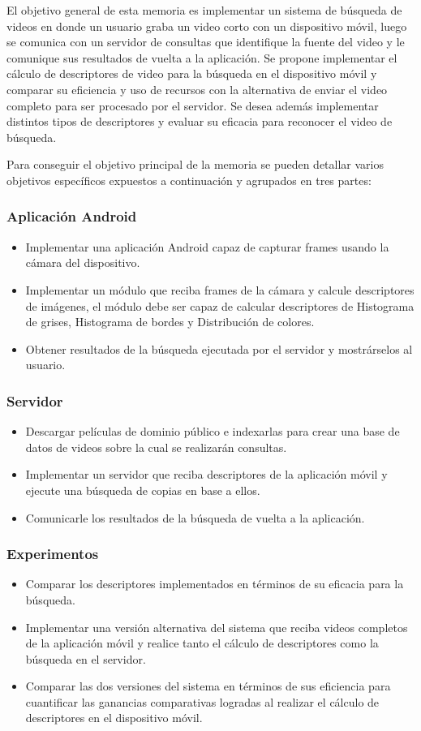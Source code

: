 El objetivo general de esta memoria es implementar un sistema de búsqueda de videos en donde un usuario graba un video corto con un dispositivo móvil, luego se comunica con un servidor de consultas que identifique la fuente del video y le comunique sus resultados de vuelta a la aplicación. Se propone implementar el cálculo de descriptores de video para la búsqueda en el dispositivo móvil y comparar su eficiencia y uso de recursos con la alternativa de enviar el video completo para ser procesado por el servidor. Se desea además implementar distintos tipos de descriptores y evaluar su eficacia para reconocer el video de búsqueda.

Para conseguir el objetivo principal de la memoria se pueden detallar varios objetivos específicos expuestos a continuación y agrupados en tres partes: 
\subsubsection*{Aplicación Android}
\begin{itemize}
\item Implementar una aplicación Android capaz de capturar frames usando la cámara del dispositivo.
\item Implementar un módulo que reciba frames de la cámara y calcule descriptores de imágenes, el módulo debe ser capaz de calcular descriptores de Histograma de grises, Histograma de bordes y Distribución de colores.
\item Obtener resultados de la búsqueda ejecutada por el servidor y mostrárselos al usuario.
\end{itemize}
\subsubsection*{Servidor}
\begin{itemize}
\item Descargar películas de dominio público e indexarlas para crear una base de datos de videos sobre la cual se realizarán consultas.
\item Implementar un servidor que reciba descriptores de la aplicación móvil y ejecute una búsqueda de copias en base a ellos.
\item Comunicarle los resultados de la búsqueda de vuelta a la aplicación.
\end{itemize}
\subsubsection*{Experimentos}
\begin{itemize}
\item Comparar los descriptores implementados en términos de su eficacia para la búsqueda.
\item Implementar una versión alternativa del sistema que reciba videos completos de la aplicación móvil y realice tanto el cálculo de descriptores como la búsqueda en el servidor.
\item Comparar las dos versiones del sistema en términos de sus eficiencia para cuantificar las ganancias comparativas logradas al realizar el cálculo de descriptores en el dispositivo móvil. 
\end{itemize}

